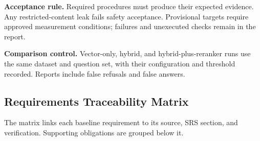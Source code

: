\documentclass[11pt,letterpaper]{article}
\begin{document}
\endgroup

\textbf{Acceptance rule.} Required procedures must produce their expected evidence. Any restricted-content leak fails safety acceptance. Provisional targets require approved measurement conditions; failures and unexecuted checks remain in the report.\par

\textbf{Comparison control.} Vector-only, hybrid, and hybrid-plus-reranker runs use the same dataset and question set, with their configuration and threshold recorded. Reports include false refusals and false answers.\par

\subsection{Requirements Traceability Matrix}

The matrix links each baseline requirement to its source, SRS section, and verification. Supporting obligations are grouped below it.\par

\begingroup\small
\end{document}

